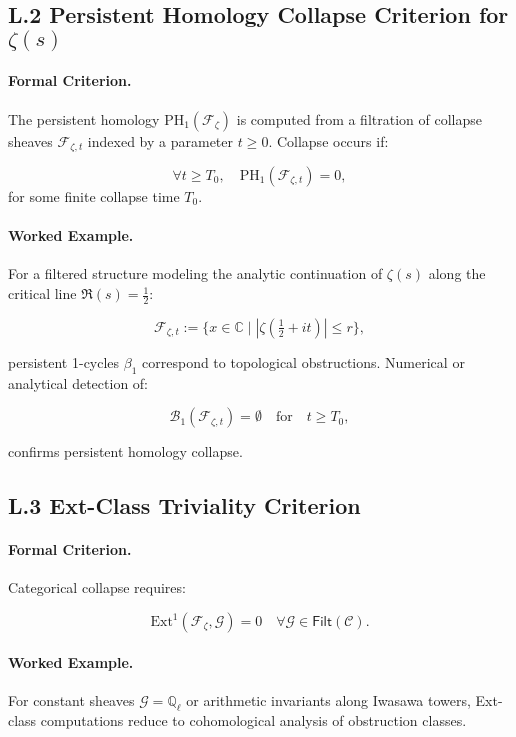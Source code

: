 \documentclass[11pt]{article}
\begin{document}
\subsection*{L.2 Persistent Homology Collapse Criterion for $\zeta(s)$}

\paragraph{Formal Criterion.}  
The persistent homology $\mathrm{PH}_1(\mathcal{F}_{\zeta})$ is computed from a filtration of collapse sheaves $\mathcal{F}_{\zeta, t}$ indexed by a parameter $t \geq 0$. Collapse occurs if:

\[
\forall t \geq T_0, \quad \mathrm{PH}_1(\mathcal{F}_{\zeta, t}) = 0,
\]
for some finite collapse time $T_0$.

\paragraph{Worked Example.}  
For a filtered structure modeling the analytic continuation of $\zeta(s)$ along the critical line $\Re(s) = \tfrac{1}{2}$:

\[
\mathcal{F}_{\zeta, t} := \{ x \in \mathbb{C} \mid |\zeta\left( \tfrac{1}{2} + it \right)| \leq r \},
\]

persistent 1-cycles $\beta_1$ correspond to topological obstructions. Numerical or analytical detection of:

\[
\mathcal{B}_1(\mathcal{F}_{\zeta, t}) = \emptyset \quad \text{for} \quad t \geq T_0,
\]

confirms persistent homology collapse.

\subsection*{L.3 Ext-Class Triviality Criterion}

\paragraph{Formal Criterion.}  
Categorical collapse requires:

\[
\mathrm{Ext}^1(\mathcal{F}_{\zeta}, \mathcal{G}) = 0 \quad \forall \mathcal{G} \in \mathsf{Filt}(\mathcal{C}).
\]

\paragraph{Worked Example.}  
For constant sheaves $\mathcal{G} = \mathbb{Q}_\ell$ or arithmetic invariants along Iwasawa towers, Ext-class computations reduce to cohomological analysis of obstruction classes.
\end{document}
